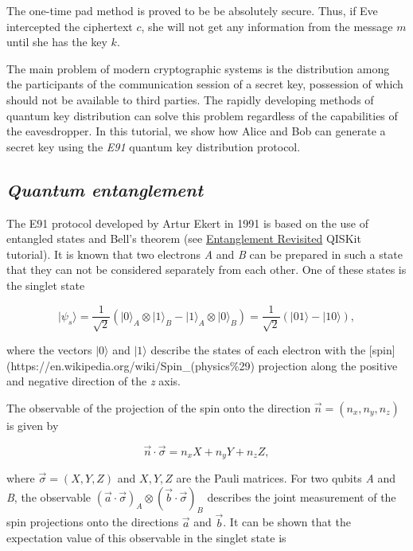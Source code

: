 \documentclass[11pt]{article}
\begin{document}
The one-time pad method is proved to be be absolutely secure. Thus, if
Eve intercepted the ciphertext \(c\), she will not get any information
from the message \(m\) until she has the key \(k\).

The main problem of modern cryptographic systems is the distribution
among the participants of the communication session of a secret key,
possession of which should not be available to third parties. The
rapidly developing methods of quantum key distribution can solve this
problem regardless of the capabilities of the eavesdropper. In this
tutorial, we show how Alice and Bob can generate a secret key using the
\emph{E91} quantum key distribution protocol.

    \subsection{\texorpdfstring{\emph{Quantum
entanglement}}{Quantum entanglement}}\label{quantum-entanglement}

    The E91 protocol developed by Artur Ekert in 1991 is based on the use of
entangled states and Bell's theorem (see
\href{https://github.com/QISKit/qiskit-tutorial/blob/master/2_quantum_information/entanglement_revisited.ipynb}{Entanglement
Revisited} QISKit tutorial). It is known that two electrons \emph{A} and
\emph{B} can be prepared in such a state that they can not be considered
separately from each other. One of these states is the singlet state

\[\lvert\psi_s\rangle =
  \frac{1}{\sqrt{2}}(\lvert0\rangle_A\otimes\lvert1\rangle_B - \lvert1\rangle_A\otimes\lvert0\rangle_B) =
  \frac{1}{\sqrt{2}}(\lvert01\rangle - \lvert10\rangle),\]

where the vectors \(\lvert 0 \rangle\) and \(\lvert 1 \rangle\) describe
the states of each electron with the
{[}spin{]}(https://en.wikipedia.org/wiki/Spin\_(physics\%29) projection
along the positive and negative direction of the \emph{z} axis.

The observable of the projection of the spin onto the direction
\(\vec{n}=(n_x, n_y, n_z)\) is given by

\[\vec{n} \cdot \vec{\sigma} = 
n_x X + n_y Y + n_z Z,\]

where \(\vec{\sigma} = (X, Y, Z)\) and \(X, Y, Z\) are the Pauli
matrices. For two qubits \emph{A} and \emph{B}, the observable
\((\vec{a} \cdot \vec{\sigma})_A \otimes (\vec{b} \cdot \vec{\sigma})_B\)
describes the joint measurement of the spin projections onto the
directions \(\vec{a}\) and \(\vec{b}\). It can be shown that the
expectation value of this observable in the singlet state is
\end{document}
